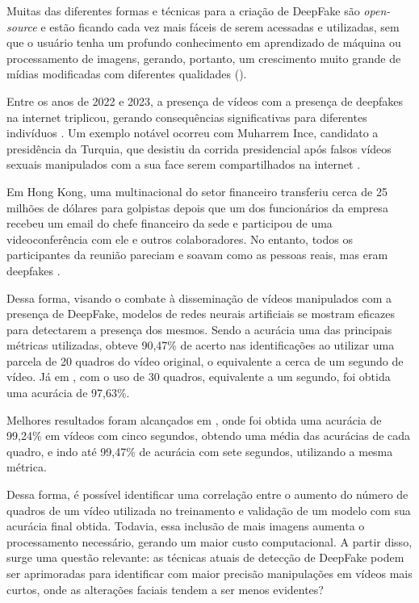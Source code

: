 \documentclass[12pt,a4paper, brazil]{article}
\begin{document}
    \par Muitas das diferentes formas e técnicas para a criação de DeepFake são \textit{open-source} e estão ficando cada vez mais fáceis de serem acessadas e utilizadas, sem que o usuário tenha um profundo conhecimento em aprendizado de máquina ou processamento de imagens, gerando, portanto, um crescimento muito grande de mídias modificadas com diferentes qualidades (\cite{electronics13030585, Heidari2024}).
    \par Entre os anos de 2022 e 2023, a presença de vídeos com a presença de deepfakes na internet triplicou, gerando consequências significativas para diferentes indivíduos \cite{Łabuz2024}. Um exemplo notável ocorreu com Muharrem Ince, candidato a presidência da Turquia, que desistiu da corrida presidencial após falsos vídeos sexuais manipulados com a sua face serem compartilhados na internet \cite{kirby_2023, Łabuz2024}.
    \par Em Hong Kong, uma multinacional do setor financeiro transferiu cerca de 25 milhões de dólares para golpistas depois que um dos funcionários da empresa recebeu um email do chefe financeiro da sede e participou de uma videoconferência com ele e outros colaboradores. No entanto, todos os participantes da reunião pareciam e soavam como as pessoas reais, mas eram deepfakes \cite{chen_magramo_2024}.
    \par Dessa forma, visando o combate à disseminação de vídeos manipulados com a presença de DeepFake, modelos de redes neurais artificiais se mostram eficazes para detectarem a presença dos mesmos. Sendo a acurácia uma das principais métricas utilizadas, \cite{Hu_Liao_Liang_Zhou_Qin_2022} obteve 90,47\% de acerto nas identificações ao utilizar uma parcela de 20 quadros do vídeo original, o equivalente a cerca de um segundo de vídeo. Já em \cite{Singh2020}, com o uso de 30 quadros, equivalente a um segundo, foi obtida uma acurácia de 97,63\%.
    \par Melhores resultados foram alcançados em \cite{Hernandez-Ortega2022}, onde foi obtida uma acurácia de 99,24\% em vídeos com cinco segundos, obtendo uma média das acurácias de cada quadro, e indo até 99,47\% de acurácia com sete segundos, utilizando a mesma métrica.
    \par Dessa forma, é possível identificar uma correlação entre o aumento do número de quadros de um vídeo utilizada no treinamento e validação de um modelo com sua acurácia final obtida. Todavia, essa inclusão de mais imagens aumenta o processamento necessário, gerando um maior custo computacional. A partir disso, surge uma questão relevante: as técnicas atuais de detecção de DeepFake podem ser aprimoradas para identificar com maior precisão manipulações em vídeos mais curtos, onde as alterações faciais tendem a ser menos evidentes?
\end{document}
